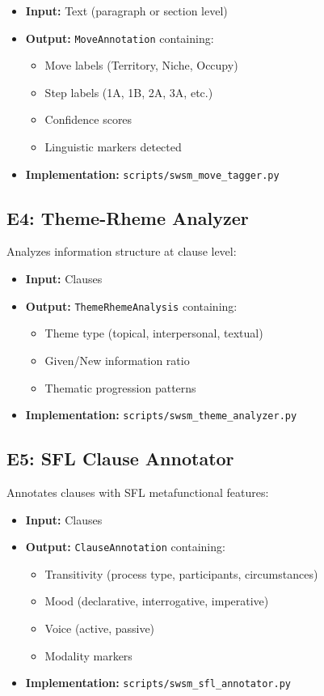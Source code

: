\begin{itemize}
    \item \textbf{Input:} Text (paragraph or section level)
    \item \textbf{Output:} \texttt{MoveAnnotation} containing:
    \begin{itemize}
        \item Move labels (Territory, Niche, Occupy)
        \item Step labels (1A, 1B, 2A, 3A, etc.)
        \item Confidence scores
        \item Linguistic markers detected
    \end{itemize}
    \item \textbf{Implementation:} \texttt{scripts/swsm\_move\_tagger.py}
\end{itemize}

\subsection{E4: Theme-Rheme Analyzer}
\label{sec:sw-e4}

Analyzes information structure at clause level:

\begin{itemize}
    \item \textbf{Input:} Clauses
    \item \textbf{Output:} \texttt{ThemeRhemeAnalysis} containing:
    \begin{itemize}
        \item Theme type (topical, interpersonal, textual)
        \item Given/New information ratio
        \item Thematic progression patterns
    \end{itemize}
    \item \textbf{Implementation:} \texttt{scripts/swsm\_theme\_analyzer.py}
\end{itemize}

\subsection{E5: SFL Clause Annotator}
\label{sec:sw-e5}

Annotates clauses with SFL metafunctional features:

\begin{itemize}
    \item \textbf{Input:} Clauses
    \item \textbf{Output:} \texttt{ClauseAnnotation} containing:
    \begin{itemize}
        \item Transitivity (process type, participants, circumstances)
        \item Mood (declarative, interrogative, imperative)
        \item Voice (active, passive)
        \item Modality markers
    \end{itemize}
    \item \textbf{Implementation:} \texttt{scripts/swsm\_sfl\_annotator.py}
\end{itemize}


